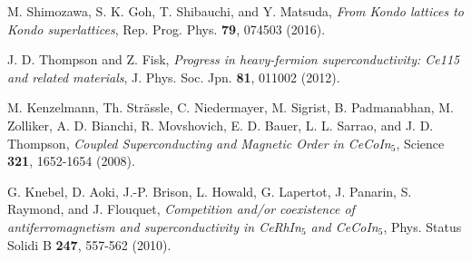 \documentclass[twocolumn,preprintnumbers,amsmath,amssymb,prl]{revtex4}
\begin{document}
\begin{thebibliography}{99}
		M. Shimozawa, S. K. Goh, T. Shibauchi, and Y. Matsuda, 
		{\it From Kondo lattices to Kondo superlattices}, 
		Rep. Prog. Phys. {\bf 79}, 074503 (2016). 
		





		J. D. Thompson and Z. Fisk, 
		{\it Progress in heavy-fermion superconductivity: Ce115 and related materials}, 
		J. Phys. Soc. Jpn. {\bf 81}, 011002 (2012). 
		
		M. Kenzelmann, Th. Str\"assle, C. Niedermayer, M. Sigrist, B. Padmanabhan, M. Zolliker, A. D. Bianchi, R. Movshovich, E. D. Bauer, L. L. Sarrao, and J. D. Thompson, 
		{\it Coupled Superconducting and Magnetic Order in CeCoIn$_5$}, 
		Science {\bf 321}, 1652-1654 (2008).
			
		G. Knebel, D. Aoki, J.-P. Brison, L. Howald, G. Lapertot, J. Panarin, S. Raymond, and J. Flouquet, 
		{\it Competition and/or coexistence of antiferromagnetism and superconductivity in CeRhIn$_5$ and CeCoIn$_5$}, 
		Phys. Status Solidi B {\bf 247}, 557-562 (2010). 


\end{thebibliography}
\end{document}
